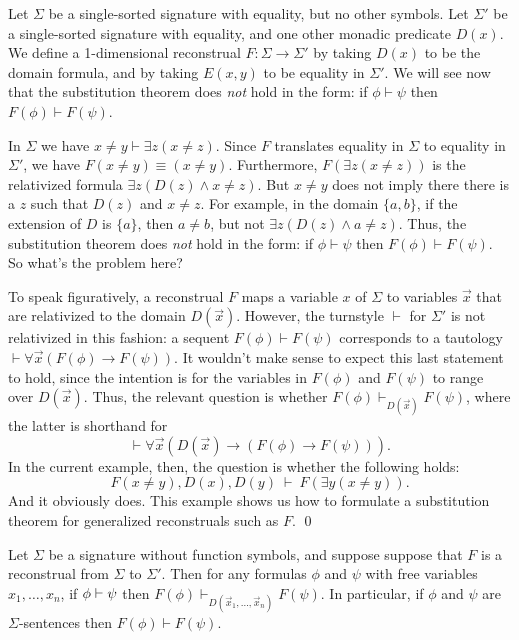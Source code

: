 \begin{example} Let $\Sigma$ be a single-sorted signature with
  equality, but no other symbols.  Let $\Sigma '$ be a single-sorted
  signature with equality, and one other monadic predicate $D(x)$.  We
  define a 1-dimensional reconstrual $F:\Sigma\to\Sigma '$ by taking
  $D(x)$ to be the domain formula, and by taking $E(x,y)$ to be
  equality in $\Sigma '$.  We will see now that the substitution
  theorem does {\it not} hold in the form: if $\phi\vdash\psi$ then
  $F(\phi)\vdash F(\psi )$.

  In $\Sigma$ we have $x\neq y \vdash \exists z(x\neq z)$.  Since $F$
  translates equality in $\Sigma$ to equality in $\Sigma '$, we have
  $F(x\neq y)\equiv (x\neq y)$.  Furthermore, $F(\exists z(x\neq z))$
  is the relativized formula $\exists z(D(z)\wedge x\neq z)$.  But
  $x\neq y$ does not imply there there is a $z$ such that $D(z)$ and
  $x\neq z$.  For example, in the domain $\{ a,b\}$, if the extension
  of $D$ is $\{ a\}$, then $a\neq b$, but not
  $\exists z(D(z)\wedge a\neq z)$.  Thus, the substitution theorem
  does {\it not} hold in the form: if $\phi\vdash\psi$ then
  $F(\phi )\vdash F(\psi )$.  So what's the problem here?

  To speak figuratively, a reconstrual $F$ maps a variable $x$ of
  $\Sigma$ to variables $\vec{x}$ that are relativized to the domain
  $D(\vec{x})$.  However, the turnstyle $\vdash$ for $\Sigma '$ is not
  relativized in this fashion: a sequent $F(\phi )\vdash F(\psi )$
  corresponds to a tautology
  $\vdash \forall \vec{x}(F(\phi )\to F(\psi ))$.  It wouldn't make
  sense to expect this last statement to hold, since the intention is
  for the variables in $F(\phi )$ and $F(\psi )$ to range over
  $D(\vec{x})$.  Thus, the relevant question is whether
  $F(\phi )\vdash _{D(\vec{x})} F(\psi )$, where the latter is
  shorthand for
  \[ \vdash \forall \vec{x}(D(\vec{x})\to (F(\phi )\to F(\psi ))) .\]
  In the current example, then, the question is whether the following
  holds:
  \[ F(x\neq y), D(x),D(y) \:\vdash \: F(\exists y(x\neq y)) .\] And
  it obviously does.  This example shows us how to formulate a
  substitution theorem for generalized reconstruals such as $F$.
  \hfill \qed \end{example}

\begin{thm}[Substitution] Let $\Sigma$ be a signature without function
  symbols, and suppose suppose that $F$ is a reconstrual from $\Sigma$
  to $\Sigma '$.  Then for any formulas $\phi$ and $\psi$ with free
  variables $x_1,\dots ,x_n$, if $\phi\vdash\psi$ then
  $F(\phi )\vdash _{D(\vec{x}_1,\dots ,\vec{x}_n)}F(\psi )$.  In
  particular, if $\phi$ and $\psi$ are $\Sigma$-sentences then
  $F(\phi )\vdash F(\psi )$.
\end{thm}

